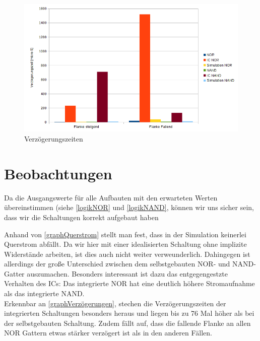 \documentclass[11pt, a4paper]{article}
\begin{document}
\begin{figure}[H]
    \centering
    \includegraphics[width=\linewidth]{images/verzoegerungen.png}
    \caption{Verzögerungszeiten}
    \label{graphVerzögerungen}
\end{figure}

\section*{Beobachtungen}
Da die Ausgangswerte für alle Aufbauten mit den erwarteten Werten übereinstimmen (siehe \autoref{logikNOR} und \autoref{logikNAND}, können wir uns sicher sein, dass wir die Schaltungen korrekt aufgebaut haben

Anhand von \autoref{graphQuerstrom} stellt man fest, dass in der Simulation keinerlei Querstrom abfällt. Da wir hier mit einer idealisierten Schaltung ohne implizite Widerstände arbeiten, ist dies auch nicht weiter verweunderlich.
Dahingegen ist allerdings der große Unterschied zwischen dem selbstgebauten NOR- und NAND-Gatter auszumachen. Besonders interessant ist dazu das entgegengestzte Verhalten des ICs: Das integrierte NOR hat eine deutlich höhere Stromaufnahme als das integrierte NAND.
\\
Erkennbar an \autoref{graphVerzögerungen}, stechen die Verzögerungszeiten der integrierten Schaltungen besonders heraus und liegen bis zu 76 Mal höher als bei der selbstgebauten Schaltung. Zudem fällt auf, dass die fallende Flanke an allen NOR Gattern etwas stärker verzögert ist als in den anderen Fällen.
\end{document}
